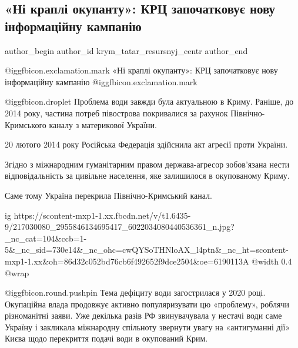  
 
 
 
 
 
\subsection{«Ні краплі окупанту»: КРЦ започатковує нову інформаційну кампанію}
\label{sec:30_07_2021.fb.krym_tatar_resursnyj_centr.1.ni_kapli_okupantu}
 
\ifcmt
 author_begin
   author_id krym_tatar_resursnyj_centr
 author_end
\fi

@igg{fbicon.exclamation.mark}
«Ні краплі окупанту»: КРЦ започатковує нову інформаційну кампанію @igg{fbicon.exclamation.mark}

 @igg{fbicon.droplet}  Проблема води завжди була актуальною в Криму. Раніше, до 2014 року, частина
потреб півострова покривалися за рахунок Північно-Кримського каналу з
материкової України.

20 лютого 2014 року Російська Федерація здійснила акт агресії проти України.

Згідно з міжнародним гуманітарним правом держава-агресор зобов’язана нести
відповідальність за цивільне населення, яке залишилося в окупованому Криму.

Саме тому Україна перекрила Північно-Кримський канал.

\ifcmt
  ig https://scontent-mxp1-1.xx.fbcdn.net/v/t1.6435-9/217030080_2955846134695417_6022034080440536361_n.jpg?_nc_cat=104&ccb=1-5&_nc_sid=730e14&_nc_ohc=cwQYSoTHNloAX_l4ptn&_nc_ht=scontent-mxp1-1.xx&oh=86d32c052bd76cb6f492652f9dce2504&oe=6190113A
  @width 0.4
  @wrap 
\fi

 @igg{fbicon.round.pushpin}  Тема дефіциту води загострилася у 2020 році. Окупаційна влада продовжує
активно популяризувати цю «проблему», роблячи різноманітні заяви. Уже декілька
разів РФ звинувачувала у нестачі води саме Україну і закликала міжнародну
спільноту звернути увагу на «антигуманні дії» Києва щодо перекриття подачі води
в окупований Крим.

